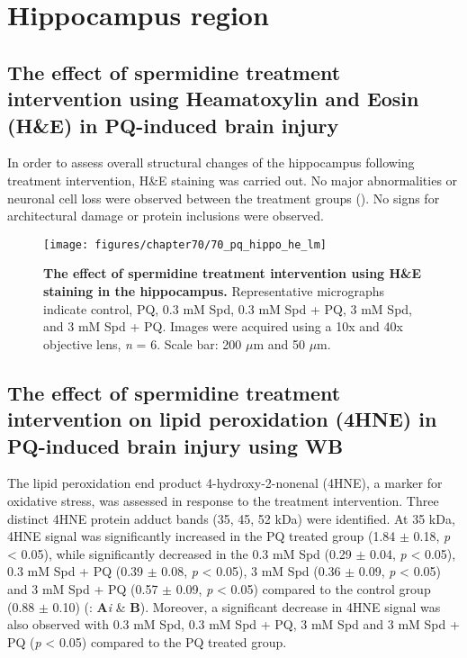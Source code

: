 \section{Hippocampus region}
\subsection{The effect of spermidine treatment intervention using Heamatoxylin and Eosin (H\&E) in PQ-induced brain injury}
In order to assess overall structural changes of the hippocampus following treatment intervention, H\&E staining was carried out. No major abnormalities or neuronal cell loss were observed between the treatment groups (). No signs for architectural damage or protein inclusions were observed.

\begin{figure}[!htbp]
\center
  \texttt{[image: figures/chapter70/70\_pq\_hippo\_he\_lm]}
  \caption[The effect of spermidine treatment intervention using H\&E staining in the hippocampus]{\textbf{The effect of spermidine treatment intervention using H\&E staining in the hippocampus.} Representative micrographs indicate control, PQ, 0.3 mM Spd, 0.3 mM Spd + PQ, 3 mM Spd, and 3 mM Spd + PQ. Images were acquired using a 10x and 40x objective lens, \textit{n} = 6. Scale bar: 200 $\mu$m and 50 $\mu$m.}
  \label{fig:70_pq_hippo_he_lm}
\end{figure} 

\subsection{The effect of spermidine treatment intervention on lipid peroxidation (4HNE) in PQ-induced brain injury using WB}
The lipid peroxidation end product 4-hydroxy-2-nonenal (4HNE), a marker for oxidative stress, was assessed in response to the treatment intervention. Three distinct 4HNE protein adduct bands (35, 45, 52 kDa) were identified. At 35 kDa, 4HNE signal was significantly increased in the PQ treated group (1.84 $\pm$ 0.18, \textit{p} < 0.05), while significantly decreased in the 0.3 mM Spd (0.29 $\pm$ 0.04, \textit{p} < 0.05), 0.3 mM Spd + PQ (0.39 $\pm$ 0.08, \textit{p} < 0.05), 3 mM Spd (0.36 $\pm$ 0.09, \textit{p} < 0.05) and 3 mM Spd + PQ (0.57 $\pm$ 0.09, \textit{p} < 0.05) compared to the control group (0.88 $\pm$ 0.10) (: \textbf{A}\textit{i} \& \textbf{B}). Moreover, a significant decrease in 4HNE signal was also observed with 0.3 mM Spd, 0.3 mM Spd + PQ, 3 mM Spd and 3 mM Spd + PQ (\textit{p} < 0.05) compared to the PQ treated group. 

